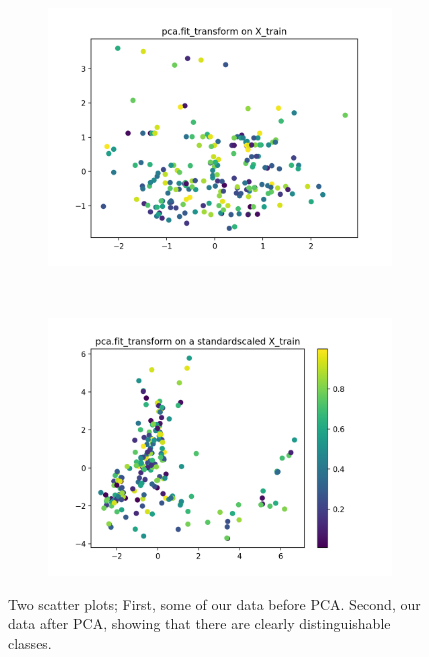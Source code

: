 \begin{figure}[H]
    \centering
    \begin{subfigure}{0.48\textwidth}
        \centering
        \includegraphics[width=\linewidth]{theory/figures/beforePCA.png}
        \caption{}
        \label{fig:vPCA}
    \end{subfigure}%
    ~ 
        \begin{subfigure}{0.48\textwidth}
        \centering
        \includegraphics[width=\linewidth]{theory/figures/Pcafigure.png}
        \caption{}
        \label{fig:PCA}
    \end{subfigure}
	\caption{Two scatter plots; First, some of our data before PCA. Second, our data after PCA, showing that there are clearly distinguishable classes.}
	\label{fig:PCA}
\end{figure}

